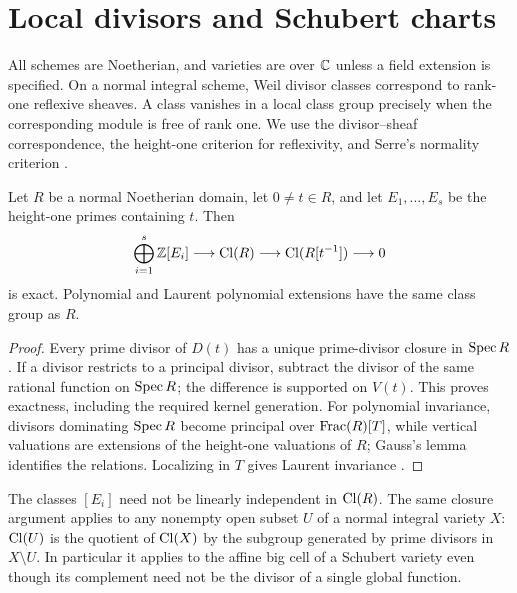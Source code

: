 \section{Local divisors and Schubert charts}\label{sec:algebra}

All schemes are Noetherian, and varieties are over $\mathbb C$ unless a field extension is specified. On a normal integral scheme, Weil divisor classes correspond to rank-one reflexive sheaves. A class vanishes in a local class group precisely when the corresponding module is free of rank one. We use the divisor--sheaf correspondence, the height-one criterion for reflexivity, and Serre's normality criterion \cite[Chapter~II, Section~6]{Har77}\cite[Tags 0EBJ, 0EBM, 0AVB, 031S]{The26}.

\begin{lemma}\label{alg:localization}
Let $R$ be a normal Noetherian domain, let $0\ne t\in R$, and let $E_1,\ldots,E_s$ be the height-one primes containing $t$. Then
\[
 \bigoplus_{i=1}^s\mathbb Z[E_i]\longrightarrow\operatorname{Cl}(R)
 \longrightarrow\operatorname{Cl}(R[t^{-1}])\longrightarrow0
\]
is exact. Polynomial and Laurent polynomial extensions have the same class group as $R$.
\end{lemma}
\begin{proof}
Every prime divisor of $D(t)$ has a unique prime-divisor closure in $\operatorname{Spec} R$. If a divisor restricts to a principal divisor, subtract the divisor of the same rational function on $\operatorname{Spec} R$; the difference is supported on $V(t)$. This proves exactness, including the required kernel generation. For polynomial invariance, divisors dominating $\operatorname{Spec} R$ become principal over $\operatorname{Frac}(R)[T]$, while vertical valuations are extensions of the height-one valuations of $R$; Gauss's lemma identifies the relations. Localizing in $T$ gives Laurent invariance \cite[Chapter~II, Propositions~6.5--6.6]{Har77}\cite{Fos73}.
\end{proof}

The classes $[E_i]$ need not be linearly independent in $\operatorname{Cl}(R)$. The same closure argument applies to any nonempty open subset $U$ of a normal integral variety $X$: $\operatorname{Cl}(U)$ is the quotient of $\operatorname{Cl}(X)$ by the subgroup generated by prime divisors in $X\setminus U$. In particular it applies to the affine big cell of a Schubert variety even though its complement need not be the divisor of a single global function.

